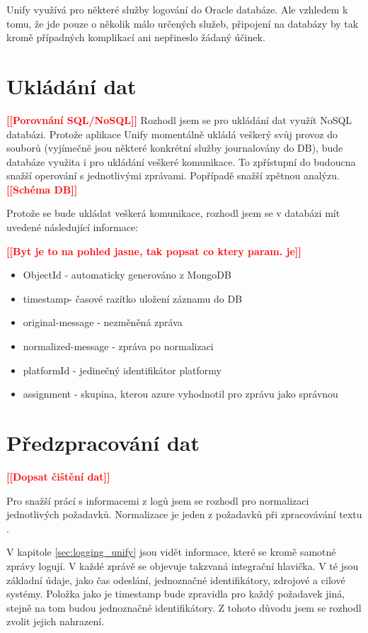 \documentclass[thesis=M,czech]{FITthesis}[2012/10/20]
\newcommand{\todo}[1]{\textcolor{red}{\textbf{[[#1]]}}}
\begin{document}
		Unify využívá pro některé služby logování do Oracle databáze. Ale vzhledem k tomu, že jde pouze o několik málo určených služeb, připojení na databázy by tak kromě případných komplikací ani nepřineslo žádaný účinek.
		
		
	\section{Ukládání dat}
		\label{sec:data_storing}
		\todo{Porovnání SQL/NoSQL}
		Rozhodl jsem se pro ukládání dat využít NoSQL databázi. Protože aplikace Unify momentálně ukládá veškerý svůj provoz do souborů (vyjímečně jsou některé konkrétní služby journalovány do DB), bude databáze využita i pro ukládání veškeré komunikace. To zpřístupní do budoucna snažší operování s jednotlivými zprávami. Popřípadě snažší zpětnou analýzu.
		\todo{Schéma DB}
		
		Protože se bude ukládat veškerá komunikace, rozhodl jsem se v databázi mít uvedené následující informace:
		
		\todo{Byt je to na pohled jasne, tak popsat co ktery param. je}
		\begin{itemize} 
			\item ObjectId - automaticky generováno z MongoDB
			\item timestamp- časové razítko uložení záznamu do DB
			\item original-message - nezměněná zpráva
			\item normalized-message - zpráva po normalizaci
			\item platformId - jedinečný identifikátor platformy
			\item assignment - skupina, kterou azure vyhodnotil pro zprávu jako správnou 		
		\end{itemize}
					
	\section{Předzpracování dat}
		\label{sec:preprocessing}
		
		\todo{Dopsat čištění dat}
		
		Pro snažší prácí s informacemi z logů jsem se rozhodl pro normalizaci jednotlivých požadavků. Normalizace je jeden z požadavků při zpracovávání textu \cite{txtNrmlztn}.
		
		V kapitole \ref{sec:logging_unify} jsou vidět informace, které se kromě samotné zprávy logují. V každé zprávě se objevuje takzvaná integrační hlavička. V té jsou základní údaje, jako čas odeslání, jednoznačné identifikátory, zdrojové a cilové systémy. Položka jako je timestamp bude zpravidla pro každý požadavek jiná, stejně na tom budou jednoznačné identifikátory. Z tohoto důvodu jsem se rozhodl zvolit jejich nahrazení.
		
\end{document}
